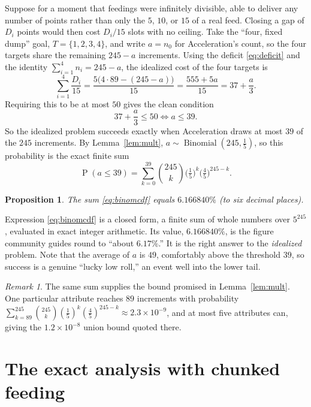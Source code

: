 \documentclass[11pt]{article}
\newtheorem{proposition}{Proposition}
\theoremstyle{remark}
\newtheorem{remark}{Remark}
\newcommand{\Prob}{\operatorname{P}}
\newcommand{\Bin}{\operatorname{Binomial}}
\begin{document}
Suppose for a moment that feedings were infinitely divisible, able to deliver any
number of points rather than only the $5$, $10$, or $15$ of a real feed. Closing a
gap of $D_i$ points would
then cost $D_i/15$ slots with no ceiling. Take the ``four, fixed dump'' goal,
$T=\{1,2,3,4\}$, and write $a=n_0$ for Acceleration's count, so the four targets
share the remaining $245-a$ increments. Using the deficit \eqref{eq:deficit} and the
identity $\sum_{i=1}^{4} n_i = 245-a$, the idealized cost of the four targets is
\[
   \sum_{i=1}^{4}\frac{D_i}{15}
   = \frac{5\big(4\cdot 89-(245-a)\big)}{15}
   = \frac{555+5a}{15}
   = 37+\frac{a}{3}.
\]
Requiring this to be at most $50$ gives the clean condition
\begin{equation}\label{eq:naivecond}
   37+\frac{a}{3}\le 50 \iff a\le 39.
\end{equation}
So the idealized problem succeeds exactly when Acceleration draws at most $39$ of the
$245$ increments. By Lemma~\ref{lem:mult}, $a\sim\Bin(245,\tfrac15)$, so this
probability is the exact finite sum
\begin{equation}\label{eq:binomcdf}
   \Prob(a\le 39)=\sum_{k=0}^{39}\binom{245}{k}\Big(\tfrac15\Big)^{k}\Big(\tfrac45\Big)^{245-k}.
\end{equation}

\begin{proposition}\label{prop:naive}
The sum \eqref{eq:binomcdf} equals $6.166840\%$ (to six decimal places).
\end{proposition}

Expression \eqref{eq:binomcdf} is a closed form, a finite sum of whole numbers over
$5^{245}$, evaluated in exact integer arithmetic. Its value, $6.166840\%$,
is the figure community guides round to ``about $6.17\%$.'' It is the right answer to
the \emph{idealized} problem. Note that the average of $a$ is $49$, comfortably above
the threshold $39$, so success is a genuine ``lucky low roll,'' an event well into
the lower tail.

\begin{remark}
The same sum supplies the bound promised in Lemma~\ref{lem:mult}. One particular
attribute reaches $89$ increments with probability
$\sum_{k=89}^{245}\binom{245}{k}(\tfrac15)^k(\tfrac45)^{245-k}\approx 2.3\times
10^{-9}$, and at most five attributes can, giving the $1.2\times 10^{-8}$ union
bound quoted there.
\end{remark}

\section{The exact analysis with chunked feeding}\label{sec:exact}
\end{document}
